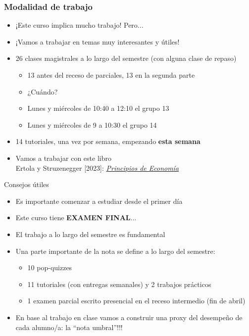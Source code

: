\documentclass{beamer}
\begin{document}
\begin{frame}
    \frametitle{Modalidad de trabajo}
    \begin{itemize}
        \item ¡Este curso implica mucho trabajo! Pero...
        \item ¡Vamos a trabajar en temas muy interesantes y útiles!
        \item 26 clases magistrales a lo largo del semestre (con alguna clase de repaso)
        \begin{itemize}
            \item 13 antes del receso de parciales, 13 en la segunda parte
            \item ¿Cuándo?
            \item Lunes y miércoles de 10:40 a 12:10 el grupo 13
            \item Lunes y miércoles de 9 a 10:30 el grupo 14
        \end{itemize}
        \item 14 tutoriales, una vez por semana, empezando \textbf{esta semana} 
        \item Vamos a trabajar con este libro \vspace{2mm}  \\
        Ertola y Struzenegger [2023]:  \textit{\href{https://principiosdeeconomia.com}{Principios de Economía}}
    \end{itemize}
\end{frame}

\begin{frame}{Consejos útiles}
    \begin{itemize}
        \item Es importante comenzar a estudiar desde el primer día
        \item Este curso tiene \textbf{EXAMEN FINAL}...
        \item El trabajo a lo largo del semestre es fundamental
        \item Una parte importante de la nota se define a lo largo del semestre:
            \begin{itemize}
                \item 10 pop-quizzes
                \item 11 tutoriales (con entregas semanales) y 2 trabajos prácticos
                \item 1 examen parcial escrito presencial en el receso intermedio (fin de abril)
            \end{itemize}
        \item En base al trabajo en clase vamos a construir una proxy del desempeño de cada alumno/a: la ``nota umbral''!!!
    \end{itemize}
\end{frame}
\end{document}
